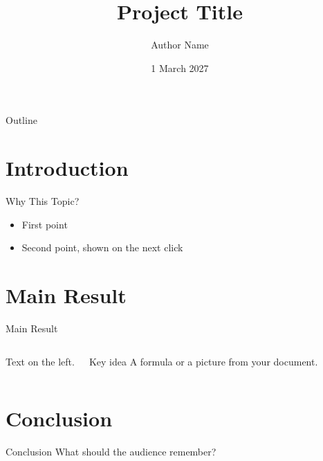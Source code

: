 \documentclass{beamer}
\title{Project Title}
\author{Author Name}
\date{1 March 2027}
\begin{document}
\begin{frame}
  \titlepage
\end{frame}

\begin{frame}{Outline}
  \tableofcontents
\end{frame}

\section{Introduction}
\begin{frame}{Why This Topic?}
  \begin{itemize}
    \item<1-> First point
    \item<2-> Second point, shown on the next click
  \end{itemize}
\end{frame}

\section{Main Result}
\begin{frame}{Main Result}
  \begin{columns}
    Text on the left.
    \begin{block}{Key idea}
      A formula or a picture from your document.
    \end{block}
  \end{columns}
\end{frame}

\section{Conclusion}
\begin{frame}{Conclusion}
  What should the audience remember?
\end{frame}
\end{document}
